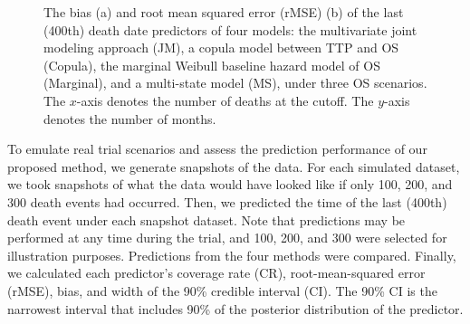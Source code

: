 \documentclass[aoas]{imsart}
\theoremstyle{plain}
\theoremstyle{remark}
\begin{document}
\begin{figure}
\centering
{}
\caption{The bias (a) and root mean squared error (rMSE) (b) of the last (400th) death date predictors of four models: the multivariate joint modeling approach (JM), a copula model between TTP and OS (Copula), the marginal Weibull baseline hazard model of OS (Marginal), and a multi-state model (MS), under three OS scenarios. The $x$-axis denotes the number of deaths at the cutoff. The $y$-axis denotes the number of months. \label{fig:result}}
\end{figure}



To emulate real trial scenarios and assess the prediction performance of our proposed method, we generate snapshots of the data. For each simulated dataset, we took snapshots of what the data would have looked like if only 100, 200, and 300 death events had occurred. Then, we predicted the time of the last (400th) death event under each snapshot dataset. Note that predictions may be performed at any time during the trial, and 100, 200, and 300 were selected for illustration purposes. Predictions from the four methods were compared. Finally, we calculated each predictor's coverage rate (CR), root-mean-squared error (rMSE), bias, and width of the 90\% credible interval (CI). The 90\% CI is the narrowest interval that includes 90\% of the posterior distribution of the predictor. 
\end{document}
